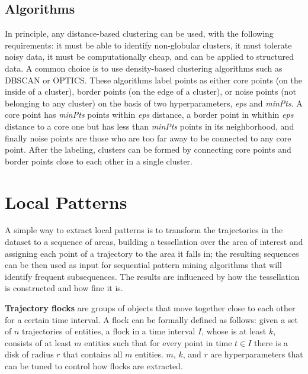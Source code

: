 \subsection{Algorithms}
In principle, any distance-based clustering can be used, with the following requirements: it must be able to identify non-globular clusters, it must tolerate noisy data, it must be computationally cheap, and can be applied to structured data. A common choice is to use density-based clustering algorithms such as DBSCAN or OPTICS. These algorithms label points as either core points (on the inside of a cluster), border points (on the edge of a cluster), or noise points (not belonging to any cluster) on the basis of two hyperparameters, \textit{eps} and \textit{minPts}. A core point has \textit{minPts} points within \textit{eps} distance, a border point in whithin \textit{eps} distance to a core one but has less than \textit{minPts} points in its neighborhood, and finally noise points are those who are too far away to be connected to any core point. After the labeling, clusters can be formed by connecting core points and border points close to each other in a single cluster.

\section{Local Patterns}
A simple way to extract local patterns is to transform the trajectories in the dataset to a sequence of areas, building a tessellation over the area of interest and assigning each point of a trajectory to the area it falls in; the resulting sequences can be then used as input for sequential pattern mining algorithms that will identify frequent subsequences. The results are influenced by how the tessellation is constructed and how fine it is.

\textbf{Trajectory flocks} are groups of objects that move together close to each other for a certain time interval. A flock can be formally defined as follows: given a set of $n$ trajectories of entities, a flock in a time interval $I$, whose is at least $k$, consists of at least $m$ entities such that for every point in time $t \in I$ there is a disk of radius $r$ that contains all $m$ entities. $m$, $k$, and $r$ are hyperparameters that can be tuned to control how flocks are extracted.

